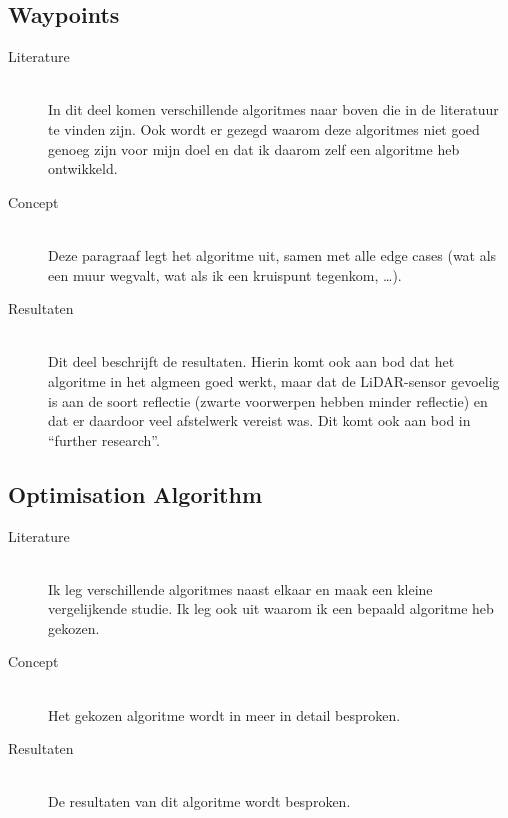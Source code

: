 \documentclass[conference,a4paper]{IEEEtran}
\begin{document}

\subsection{Waypoints}
\begin{description}
\item[Literature] \hfill \\ In dit deel komen verschillende algoritmes naar boven die in de literatuur te vinden zijn. Ook wordt er gezegd waarom deze algoritmes niet goed genoeg zijn voor mijn doel en dat ik daarom zelf een algoritme heb ontwikkeld.

\item[Concept] \hfill \\ Deze paragraaf legt het algoritme uit, samen met alle edge cases (wat als een muur wegvalt, wat als ik een kruispunt tegenkom, \ldots).

\item[Resultaten] \hfill \\ Dit deel beschrijft de resultaten. Hierin komt ook aan bod dat het algoritme in het algmeen goed werkt, maar dat de LiDAR-sensor gevoelig is aan de soort reflectie (zwarte voorwerpen hebben minder reflectie) en dat er daardoor veel afstelwerk vereist was. Dit komt ook aan bod in “further research”.

\end{description}

\subsection{Optimisation Algorithm}
\begin{description}
\item[Literature] \hfill \\ Ik leg verschillende algoritmes naast elkaar en maak een kleine vergelijkende studie. Ik leg ook uit waarom ik een bepaald algoritme heb gekozen.

\item[Concept] \hfill \\ Het gekozen algoritme wordt in meer in detail besproken.

\item[Resultaten] \hfill \\ De resultaten van dit algoritme wordt besproken.

\end{description}
\end{document}
